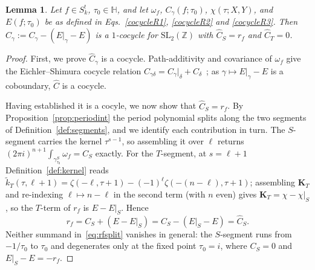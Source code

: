\documentclass[11pt]{article}
\newtheorem{lemma}[theorem]{Lemma}
\newcommand{\HH}{\mathbb{H}}
\newcommand{\ZZ}{\mathbb{Z}}
\newcommand{\SLZ}{\mathrm{SL}_2(\ZZ)}
\newcommand{\tk}{\widetilde{k}_T}
\begin{document}
\begin{lemma}\label{lem:cocycle}
Let $f\in S_k^!$, $\tau_0\in\HH$, and let $\omega_f$, $C_\gamma(f; \tau_0)$, $\chi(\tau; X, Y)$, and
$E(f;\tau_0)$ be as defined in Eqs.~\eqref{cocycleR1}, \eqref{cocycleR2} and \eqref{cocycleR3}. 
Then $\hat C_\gamma:=C_\gamma-(E|_\gamma-E)$ is a $1$-cocycle for $\SLZ$ with 
$\hat C_S=r_f$ and $\hat C_T=0$. 
\end{lemma}

\begin{proof}
First, we prove $\hat C_\gamma$ is a cocycle. Path-additivity and covariance of $\omega_f$ give the Eichler--Shimura cocycle relation
$C_{\gamma\delta}=C_\gamma|_\delta+C_\delta$~\cite{BCD2018,KZ1984}; as $\gamma\mapsto E|_\gamma-E$ is a
coboundary, $\hat C$ is a cocycle.

Having established it is a cocyle, we now show that $\hat C_S=r_f$. By
Proposition~\ref{prop:periodint} the period polynomial splits along the two segments of
Definition~\ref{def:segments}, and we identify each contribution in turn. The $S$-segment carries
the kernel $\tau^{s-1}$, so assembling it over $\ell$ returns
$(2\pi i)^{n+1}\int_{\gamma^S_{\tau_0}}\omega_f=C_S$ exactly. For the $T$-segment, at $s=\ell+1$
Definition~\ref{def:kernel} reads
$\tk(\tau,\ell+1)=\zeta(-\ell,\tau+1)-(-1)^\ell\zeta(-(n-\ell),\tau+1)$; assembling $\mathbf K_T$ and
re-indexing $\ell\mapsto n-\ell$ in the second term (with $n$ even) gives $\mathbf K_T=\chi-\chi|_S$,
so the $T$-term of $r_f$ is $E-E|_S$. Hence
\begin{equation}\label{eq:rfsplit}
r_f=C_S+(E-E|_S)=C_S-(E|_S-E)=\hat C_S .
\end{equation}
Neither summand in~\eqref{eq:rfsplit} vanishes in general: the $S$-segment runs from $-1/\tau_0$ to
$\tau_0$ and degenerates only at the fixed point $\tau_0=i$, where $C_S=0$ and $E|_S-E=-r_f$.


\end{proof}
\end{document}

